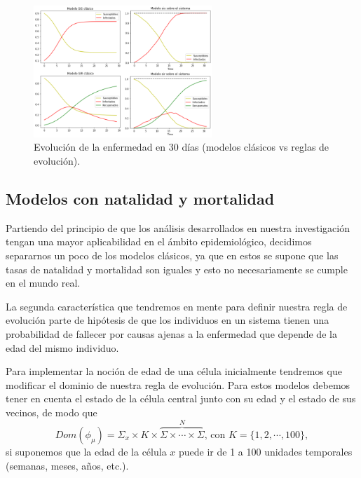 \begin{example}
\begin{figure}[h]
  \centering
    \includegraphics[width=0.6\textwidth]{Imagenes/solucionesSISySIR1.PNG}
    \caption{Evolución de la enfermedad en 30 días (modelos clásicos vs reglas de evolución).}
    \label{fig:sirEn30}
\end{figure}
\end{example}

\subsection{Modelos con natalidad y mortalidad}\label{sub:NatalidadyMortalidad}
Partiendo del principio de que los análisis desarrollados en nuestra investigación tengan una mayor aplicabilidad en el ámbito epidemiológico, decidimos separarnos un poco de los modelos clásicos, ya que en estos se supone que las tasas de natalidad y mortalidad son iguales y esto no necesariamente se cumple en el mundo real.

La segunda característica que tendremos en mente para definir nuestra regla de evolución parte de hipótesis de que los individuos en un sistema tienen una probabilidad de fallecer por causas ajenas a la enfermedad que depende de la edad del mismo individuo.

Para implementar la noción de edad de una célula inicialmente tendremos que modificar el dominio de nuestra regla de evolución. Para estos modelos debemos tener en cuenta el estado de la célula central junto con su edad y el estado de sus vecinos, de modo que 
$$Dom(\phi_\mu)=\Sigma_x\times K\times\overbrace{\Sigma\times\cdots\times\Sigma}^N\text{, con }K=\{1,2,\cdots,100\},$$
si suponemos que la edad de la célula $x$ puede ir de 1 a 100 unidades temporales (semanas, meses, años, etc.).

